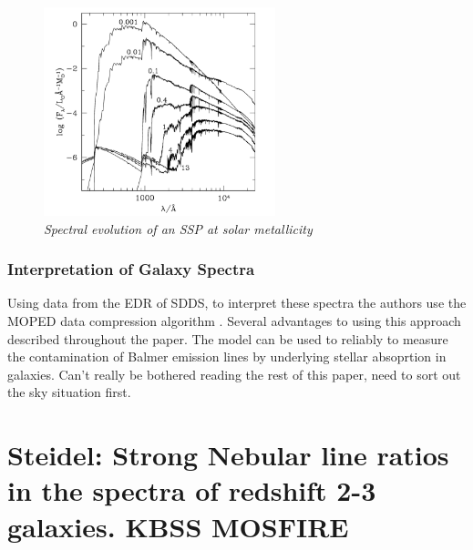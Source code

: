 \documentclass{literature}
\begin{document}
\begin{figure}[!htp]
\centering
\includegraphics[width=0.6\textwidth]{bc03_spectra.png}
\caption{\footnotesize{\emph{Spectral evolution of an SSP at solar metallicity}}}
\label{fig:BC03_spectra}
\end{figure} 


\subsubsection{Interpretation of Galaxy Spectra}
Using data from the EDR of SDDS, to interpret these spectra the authors use the MOPED data compression algorithm \citep{Heavens2000}. Several advantages to using this approach described throughout the paper. The model can be used to reliably to measure the contamination of Balmer emission lines by underlying stellar absoprtion in galaxies. Can't really be bothered reading the rest of this paper, need to sort out the sky situation first.   







\section{Steidel: Strong Nebular line ratios in the spectra of redshift 2-3 galaxies. KBSS MOSFIRE}
\end{document}
